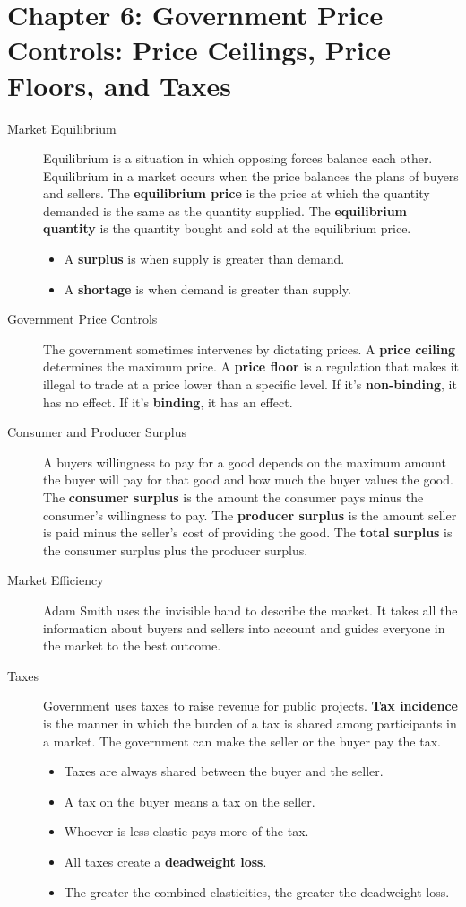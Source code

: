 \documentclass{article}
\begin{document}
\section*{Chapter 6: Government Price Controls: Price Ceilings, Price Floors, and Taxes}
\begin{description}
    \item [Market Equilibrium] Equilibrium is a situation in which opposing forces balance each other. Equilibrium in a market occurs when the price balances the plans of buyers and sellers. The \textbf{equilibrium price} is the price at which the quantity demanded is the same as the quantity supplied. The \textbf{equilibrium quantity} is the quantity bought and sold at the equilibrium price.
    \begin{itemize}
        \item A \textbf{surplus} is when supply is greater than demand.
        \item A \textbf{shortage} is when demand is greater than supply.
    \end{itemize}
    \item [Government Price Controls] The government sometimes intervenes by dictating prices. A \textbf{price ceiling} determines the maximum price. A \textbf{price floor} is a regulation that makes it illegal to trade at a price lower than a specific level. If it's \textbf{non-binding}, it has no effect. If it's \textbf{binding}, it has an effect.
    \item [Consumer and Producer Surplus] A buyers willingness to pay for a good depends on the maximum amount the buyer will pay for that good and how much the buyer values the good. The \textbf{consumer surplus} is the amount the consumer pays minus the consumer's willingness to pay. The \textbf{producer surplus} is the amount seller is paid minus the seller's cost of providing the good. The \textbf{total surplus} is the consumer surplus plus the producer surplus.
    \item [Market Efficiency] Adam Smith uses the invisible hand to describe the market. It takes all the information about buyers and sellers into account and guides everyone in the market to the best outcome.
    \item [Taxes] Government uses taxes to raise revenue for public projects. \textbf{Tax incidence} is the manner in which the burden of a tax is shared among participants in a market. The government can make the seller or the buyer pay the tax. 
    \begin{itemize}
        \item Taxes are always shared between the buyer and the seller.
        \item A tax on the buyer means a tax on the seller.
        \item Whoever is less elastic pays more of the tax.
        \item All taxes create a \textbf{deadweight loss}.
        \item The greater the combined elasticities, the greater the deadweight loss.
    \end{itemize}
\end{description}
\end{document}

